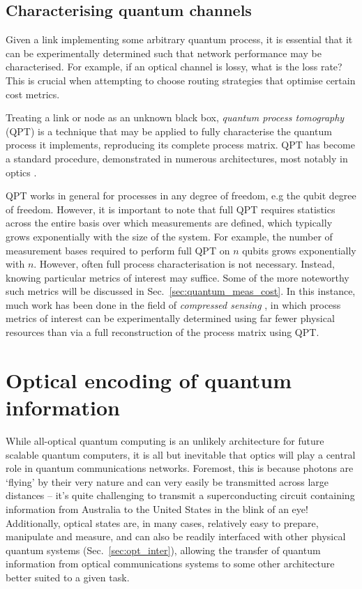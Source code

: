 \documentclass[aps,rmp,twocolumn,amsmath,amssymb,nofootinbib,superscriptaddress,longbibliography,floatfix]{revtex4-1}
\begin{document}
%
%

\subsection{Characterising quantum channels}

Given a link implementing some arbitrary quantum process, it is essential that it can be experimentally determined such that network performance may be characterised. For example, if an optical channel is lossy, what is the loss rate? This is crucial when attempting to choose routing strategies that optimise certain cost metrics.

Treating a link or node as an unknown black box, \emph{quantum process tomography} (QPT) \cite{bib:ChuangNielsen97, ???} is a technique that may be applied to fully characterise the quantum process it implements, reproducing its complete process matrix. QPT has become a standard procedure, demonstrated in numerous architectures, most notably in optics \cite{bib:OBrien04, bib:RohdeGateChar05}.

QPT works in general for processes in any degree of freedom, e.g the qubit degree of freedom. However, it is important to note that full QPT requires statistics across the entire basis over which measurements are defined, which typically grows exponentially with the size of the system. For example, the number of measurement bases required to perform full QPT on $n$ qubits grows exponentially with $n$. However, often full process characterisation is not necessary. Instead, knowing particular metrics of interest may suffice. Some of the more noteworthy such metrics will be discussed in Sec.~\ref{sec:quantum_meas_cost}. In this instance, much work has been done in the field of \emph{compressed sensing} \cite{??? compressed_sensing}, in which process metrics of interest can be experimentally determined using far fewer physical resources than via a full reconstruction of the process matrix using QPT.

%
%

\section{Optical encoding of quantum information} \label{sec:opt_enc_of_qi}

While all-optical quantum computing is an unlikely architecture for future scalable quantum computers, it is all but inevitable that optics will play a central role in quantum communications networks. Foremost, this is because photons are `flying' by their very nature and can very easily be transmitted across large distances -- it's quite challenging to transmit a superconducting circuit containing information from Australia to the United States in the blink of an eye! Additionally, optical states are, in many cases, relatively easy to prepare, manipulate and measure, and can also be readily interfaced with other physical quantum systems (Sec.~\ref{sec:opt_inter}), allowing the transfer of quantum information from optical communications systems to some other architecture better suited to a given task.
\end{document}
